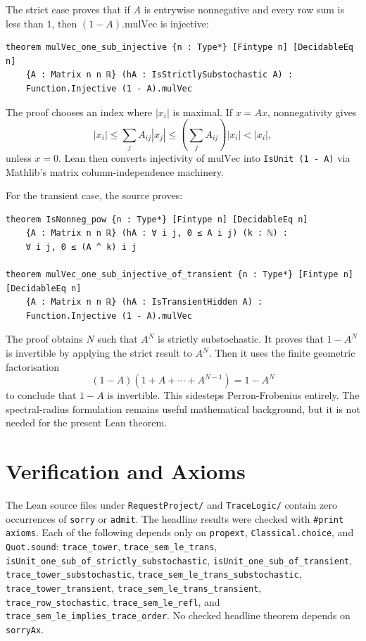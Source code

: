 \documentclass[11pt]{article}
\begin{document}
The strict case proves that if \(A\) is entrywise nonnegative and every row sum is less than \(1\), then \((1-A)\mathrm{.mulVec}\) is injective:
\begin{lstlisting}[style=lean]
theorem mulVec_one_sub_injective {n : Type*} [Fintype n] [DecidableEq n]
    {A : Matrix n n ℝ} (hA : IsStrictlySubstochastic A) :
    Function.Injective (1 - A).mulVec
\end{lstlisting}
The proof chooses an index where \(|x_i|\) is maximal.
If \(x=Ax\), nonnegativity gives
\[
 |x_i| \leq \sum_j A_{ij}|x_j| \leq \left(\sum_j A_{ij}\right)|x_i| < |x_i|,
\]
unless \(x=0\).
Lean then converts injectivity of \(\mathrm{mulVec}\) into \texttt{IsUnit (1 - A)} via Mathlib's matrix column-independence machinery.

For the transient case, the source proves:
\begin{lstlisting}[style=lean]
theorem IsNonneg_pow {n : Type*} [Fintype n] [DecidableEq n]
    {A : Matrix n n ℝ} (hA : ∀ i j, 0 ≤ A i j) (k : ℕ) :
    ∀ i j, 0 ≤ (A ^ k) i j

theorem mulVec_one_sub_injective_of_transient {n : Type*} [Fintype n] [DecidableEq n]
    {A : Matrix n n ℝ} (hA : IsTransientHidden A) :
    Function.Injective (1 - A).mulVec
\end{lstlisting}
The proof obtains \(N\) such that \(A^N\) is strictly substochastic.
It proves that \(1-A^N\) is invertible by applying the strict result to \(A^N\).
Then it uses the finite geometric factorisation
\[
  (1-A)(1+A+\cdots+A^{N-1}) = 1-A^N
\]
to conclude that \(1-A\) is invertible.
This sidesteps Perron-Frobenius entirely.
The spectral-radius formulation remains useful mathematical background, but it is not needed for the present Lean theorem.

\section{Verification and Axioms}

The Lean source files under \texttt{RequestProject/} and \texttt{TraceLogic/} contain zero occurrences of \texttt{sorry} or \texttt{admit}.
The headline results were checked with \texttt{\#print axioms}.
Each of the following depends only on \texttt{propext}, \texttt{Classical.choice}, and \texttt{Quot.sound}: \texttt{trace_tower}, \texttt{trace_sem_le_trans}, \texttt{isUnit_one_sub_of_strictly_substochastic}, \texttt{isUnit_one_sub_of_transient}, \texttt{trace_tower_substochastic}, \texttt{trace_sem_le_trans_substochastic}, \texttt{trace_tower_transient}, \texttt{trace_sem_le_trans_transient}, \texttt{trace_row_stochastic}, \texttt{trace_sem_le_refl}, and \texttt{trace_sem_le_implies_trace_order}.
No checked headline theorem depends on \texttt{sorryAx}.
\end{document}
